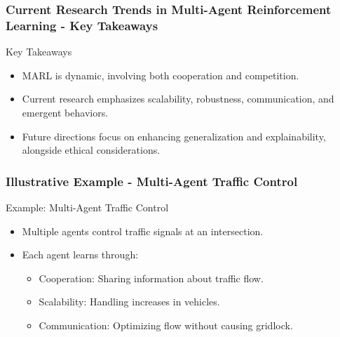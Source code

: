 \documentclass[aspectratio=169]{beamer}
\begin{document}
\begin{frame}[fragile]
    \frametitle{Current Research Trends in Multi-Agent Reinforcement Learning - Key Takeaways}
    \begin{block}{Key Takeaways}
        \begin{itemize}
            \item MARL is dynamic, involving both cooperation and competition.
            \item Current research emphasizes scalability, robustness, communication, and emergent behaviors.
            \item Future directions focus on enhancing generalization and explainability, alongside ethical considerations.
        \end{itemize}
    \end{block}
\end{frame}

\begin{frame}[fragile]
    \frametitle{Illustrative Example - Multi-Agent Traffic Control}
    \begin{block}{Example: Multi-Agent Traffic Control}
        \begin{itemize}
            \item Multiple agents control traffic signals at an intersection.
            \item Each agent learns through:
            \begin{itemize}
                \item Cooperation: Sharing information about traffic flow.
                \item Scalability: Handling increases in vehicles.
                \item Communication: Optimizing flow without causing gridlock.
            \end{itemize}
        \end{itemize}
    \end{block}
\end{frame}
\end{document}
